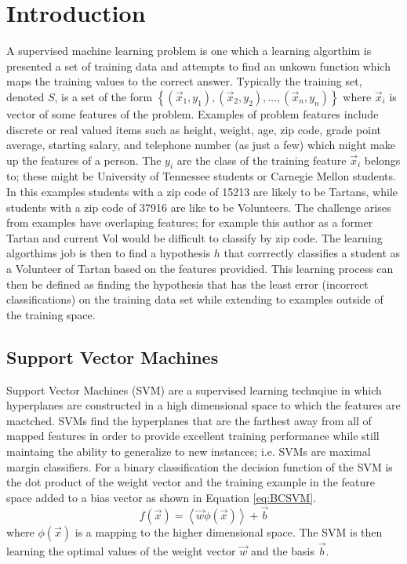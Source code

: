 \section{Introduction}

A supervised machine learning problem is one which a learning algorthim is presented a set of training data and attempts to find an unkown function which maps the training values to the correct answer.
Typically the training set, denoted $S$, is a set of the form $\left \{ (\vec{x}_1,y_1), (\vec{x}_2,y_2), \dots, (\vec{x}_n,y_n) \right \}$ where $\vec{x}_i$ is vector of some features of the problem.
Examples of problem features include discrete or real valued items such as height, weight, age, zip code, grade point average, starting salary, and telephone number (as just a few)  which might make up the features of a person.
The $y_i$ are the class of the training feature $\vec{x}_i$ belongs to; these might be University of Tennessee students or Carnegie Mellon students.
In this examples students with a zip code of 15213 are likely to be Tartans, while students with a zip code of 37916 are like to be Volunteers.
The challenge arises from examples have overlaping features; for example this author as a former Tartan and current Vol would be difficult to classify by zip code.
The learning algorthims job is then to find a hypothesis $h$ that corrrectly classifies a student as a Volunteer of Tartan based on the features providied.
This learning process can then be defined as finding the hypothesis that has the least error (incorrect classifications) on the training data set while extending to examples outside of the training space.

\subsection{Support Vector Machines}
Support Vector Machines (SVM) are a supervised learning technqiue in which hyperplanes are constructed in a high dimensional space to which the features are mactched.
SVMs find the hyperplanes that are the farthest away from all of mapped features in order to provide excellent training performance while still maintaing the ability to generalize to new instances; i.e. SVMs are maximal margin classifiers.
For a binary classification the decision function of the SVM is the dot product of the weight vector and the training example in the feature space added to a bias vector as shown in Equation \ref{eq:BCSVM}.
\begin{equation}
\label{eq:BCSVM}
f \left ( \vec{x} \right ) = \left \langle \vec{w} \phi(\vec{x}) \right \rangle + \vec{b}
\end{equation}
where $\phi(\vec{x})$ is a mapping to the higher dimensional space.
The SVM is then learning the optimal values of the weight vector $\vec{w}$ and the basis $\vec{b}$.

